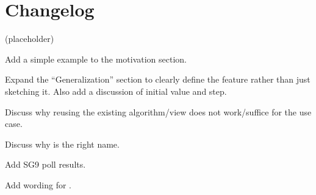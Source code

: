 \section{Changelog}
(placeholder)
\begin{revision}
\item Add a simple example to the motivation section.
\item Expand the “Generalization” section to clearly define the feature rather
  than just sketching it.
  Also add a discussion of initial value and step.
\item Discuss why reusing the existing  algorithm/view does not
  work/suffice for the  use case.
\item Discuss why  is the right name.
\end{revision}

\begin{revision}
\item Add SG9 poll results.
\item Add wording for .
\end{revision}
